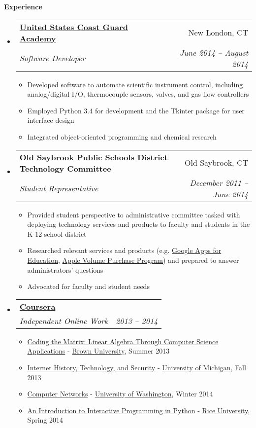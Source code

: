 \documentclass[letterpaper,10pt]{article}
\makeatletter
\newcommand{\resitem}[1]{\item #1 \vspace{-2pt}}
\newcommand{\resheading}[1]{{\large \colorbox{mygrey}{\begin{minipage}{\textwidth}{\textbf{#1 \vphantom{p\^{E}}}}\end{minipage}}}}
\newcommand{\ressubheading}[4]{
\begin{tabular*}{6.8in}{l@{\extracolsep{\fill}}r}
		\textbf{#1} & #2 \\
		\emph{#3} & \emph{#4} \\
\end{tabular*}\vspace{-6pt}}
\makeatother
\begin{document}
\resheading{Experience}
	\begin{itemize}[leftmargin=*]
		\item[] 
			\ressubheading{\href{http://www.uscga.edu}{United States Coast Guard Academy}}{New London, CT}
				{Software Developer}{June 2014 -- August 2014}
				{ \footnotesize
				\begin{itemize}
					\resitem{Developed software to automate scientific instrument control, including analog/digital I/O, thermocouple sensors, valves, and gas flow controllers}
					\resitem{Employed Python 3.4 for development and the Tkinter package for user interface design}
					\resitem{Integrated object-oriented programming and chemical research}
				\end{itemize}
				}
		\item[]
			\ressubheading{\href{http://www.oldsaybrookschools.org}{Old Saybrook Public Schools} District Technology Committee}{Old Saybrook, CT}
				{Student Representative}{December 2011 --  June 2014}
				{\footnotesize
				\begin{itemize}
					\resitem{Provided student perspective to administrative committee tasked with deploying technology services and products to faculty and students in the K-12 school district}
					\resitem{Researched relevant services and products (e.g. \href{https://www.google.com/work/apps/education/}{Google Apps for Education}, \href{http://www.apple.com/education/it/vpp/}{Apple Volume Purchase Program}) and prepared to answer administrators' questions}
					\resitem{Advocated for faculty and student needs}
				\end{itemize}}
		\item[]
		\ressubheading{\href{http://coursera.com}{Coursera}}{}{Independent Online Work}{2013 -- 2014}
		{\footnotesize
			\begin{itemize}
				\resitem{\href{https://coursera.org/course/matrix}{Coding the Matrix: Linear Algebra Through Computer Science Applications} - \href{http://brown.edu}{Brown University}, Summer 2013}
				\resitem{\href{https://coursera.org/course/insidetheinternet}{Internet History, Technology, and Security} - \href{http://umich.edu}{University of Michigan}, Fall 2013}
				\resitem{\href{https://coursera.org/course/comnetworks}{Computer Networks} - \href{http://uw.edu}{University of Washington}, Winter 2014}
				\resitem{\href{https://coursera.org/course/interactivepython}{An Introduction to Interactive Programming in Python} - \href{http://rice.edu}{Rice University}, Spring 2014}
			\end{itemize}}

\end{itemize}
\end{document}
